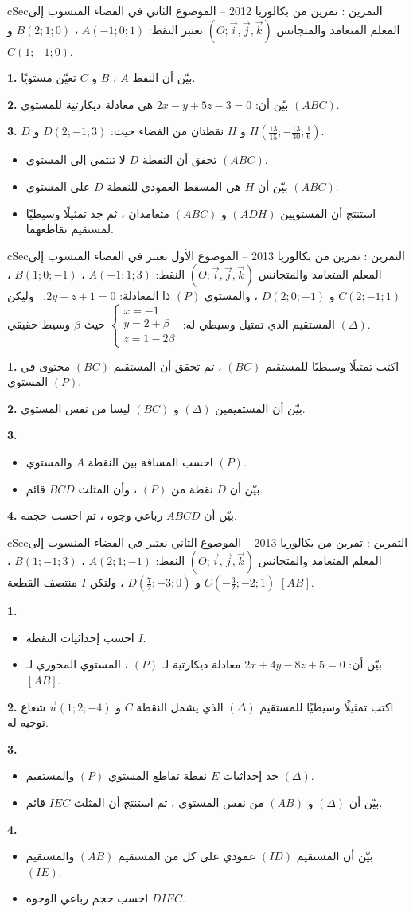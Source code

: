 \documentclass[12pt,a4paper]{article}
\newenvironment{BOX}[2]{\begin{otherlanguage}{english}\begin{arbox}{#1}{#2}}{\end{arbox}\end{otherlanguage}}
\newcounter{exo}
\newenvironment{tamrin}[1]{\stepcounter{exo}\begin{BOX}{cSec}{التمرين \theexo: #1}}{\end{BOX}}
\newenvironment{sq}{\begin{itemize}[leftmargin=2.4em,itemsep=3pt]}{\end{itemize}}
\newcommand{\qa}{\item[(أ)]}\newcommand{\qb}{\item[(ب)]}\newcommand{\qc}{\item[(جـ)]}\newcommand{\qd}{\item[(د)]}\newcommand{\qe}{\item[(هـ)]}
\newcommand{\QQ}[1]{\par\smallskip\textbf{#1.} }
\newcommand{\Rep}{(O;\vec i,\vec j,\vec k)}
\newcommand{\Sys}[1]{\left\{\begin{array}{l}#1\end{array}\right.}
\begin{document}
\begin{tamrin}{تمرين من بكالوريا 2012 -- الموضوع الثاني}
في الفضاء المنسوب إلى المعلم المتعامد والمتجانس $\Rep$ نعتبر النقط: $A(-1;0;1)$ ، $B(2;1;0)$ و $C(1;-1;0)$.
\QQ{1} بيّن أن النقط $A$ ، $B$ و $C$ تعيّن مستويًا.
\QQ{2} بيّن أن: $2x-y+5z-3=0$ هي معادلة ديكارتية للمستوي $(ABC)$.
\QQ{3} $D$ و $H$ نقطتان من الفضاء حيث: $D(2;-1;3)$ و $H\left(\frac{13}{15};-\frac{13}{30};\frac16\right)$.
\begin{sq}
\qa تحقق أن النقطة $D$ لا تنتمي إلى المستوي $(ABC)$.
\qb بيّن أن $H$ هي المسقط العمودي للنقطة $D$ على المستوي $(ABC)$.
\qc استنتج أن المستويين $(ADH)$ و $(ABC)$ متعامدان ، ثم جد تمثيلًا وسيطيًا لمستقيم تقاطعهما.
\end{sq}
\end{tamrin}
\begin{tamrin}{تمرين من بكالوريا 2013 -- الموضوع الأول}
نعتبر في الفضاء المنسوب إلى المعلم المتعامد والمتجانس $\Rep$ النقط: $A(-1;1;3)$ ، $B(1;0;-1)$ ، $C(2;-1;1)$ و $D(2;0;-1)$ ، والمستوي $(P)$ ذا المعادلة: $2y+z+1=0$. \ وليكن $(\Delta)$ المستقيم الذي تمثيل وسيطي له: $\Sys{x=-1\\y=2+\beta\\z=1-2\beta}$ حيث $\beta$ وسيط حقيقي.
\QQ{1} اكتب تمثيلًا وسيطيًا للمستقيم $(BC)$ ، ثم تحقق أن المستقيم $(BC)$ محتوى في المستوي $(P)$.
\QQ{2} بيّن أن المستقيمين $(\Delta)$ و $(BC)$ ليسا من نفس المستوي.
\QQ{3}
\begin{sq}
\qa احسب المسافة بين النقطة $A$ والمستوي $(P)$.
\qb بيّن أن $D$ نقطة من $(P)$ ، وأن المثلث $BCD$ قائم.
\end{sq}
\QQ{4} بيّن أن $ABCD$ رباعي وجوه ، ثم احسب حجمه.
\end{tamrin}
\begin{tamrin}{تمرين من بكالوريا 2013 -- الموضوع الثاني}
نعتبر في الفضاء المنسوب إلى المعلم المتعامد والمتجانس $\Rep$ النقط: $A(2;1;-1)$ ، $B(1;-1;3)$ ، $C\left(-\frac32;-2;1\right)$ و $D\left(\frac72;-3;0\right)$ ، ولتكن $I$ منتصف القطعة $[AB]$.
\QQ{1}
\begin{sq}
\qa احسب إحداثيات النقطة $I$.
\qb بيّن أن: $2x+4y-8z+5=0$ معادلة ديكارتية لـ $(P)$ ، المستوي المحوري لـ $[AB]$.
\end{sq}
\QQ{2} اكتب تمثيلًا وسيطيًا للمستقيم $(\Delta)$ الذي يشمل النقطة $C$ و $\vec u(1;2;-4)$ شعاع توجيه له.
\QQ{3}
\begin{sq}
\qa جد إحداثيات $E$ نقطة تقاطع المستوي $(P)$ والمستقيم $(\Delta)$.
\qb بيّن أن $(\Delta)$ و $(AB)$ من نفس المستوي ، ثم استنتج أن المثلث $IEC$ قائم.
\end{sq}
\QQ{4}
\begin{sq}
\qa بيّن أن المستقيم $(ID)$ عمودي على كل من المستقيم $(AB)$ والمستقيم $(IE)$.
\qb احسب حجم رباعي الوجوه $DIEC$.
\end{sq}
\end{tamrin}
\end{document}
